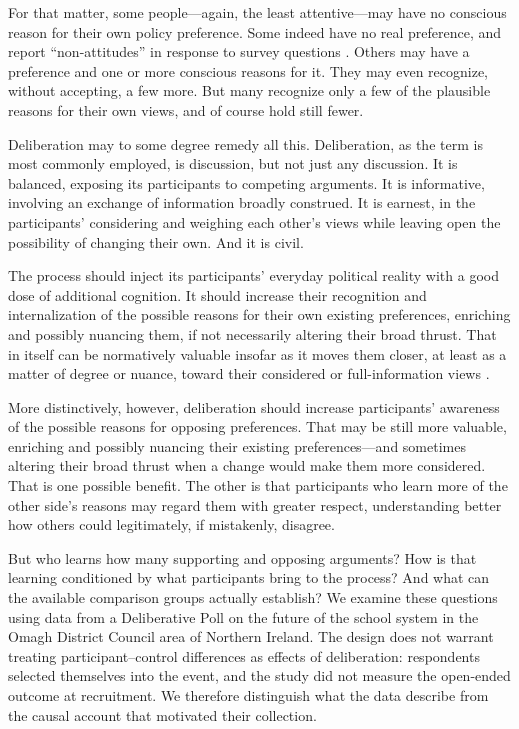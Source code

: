 \documentclass[11pt]{article}
\begin{document}
For that matter, some people---again, the least attentive---may have no conscious reason for
their own policy preference. Some indeed have no real preference, and report ``non-attitudes''
in response to survey questions \citep{converse1964nature,converse1970attitudes}. Others may have a preference
and one or more conscious reasons for it. They may even recognize, without accepting, a few
more. But many recognize only a few of the plausible reasons for their own views, and of course
hold still fewer.

Deliberation may to some degree remedy all this. Deliberation, as the term is most commonly
employed, is discussion, but not just any discussion. It is balanced, exposing its participants
to competing arguments. It is informative, involving an exchange of information broadly
construed. It is earnest, in the participants' considering and weighing each other's views while
leaving open the possibility of changing their own. And it is civil.

The process should inject its participants' everyday political reality with a good dose of
additional cognition. It should increase their recognition and internalization of the possible
reasons for their own existing preferences, enriching and possibly nuancing them, if not
necessarily altering their broad thrust. That in itself can be normatively valuable insofar as
it moves them closer, at least as a matter of degree or nuance, toward their considered or
full-information views \citep{tocqueville1969democracy,fishkin1991democracy,
dahl1989democracy,arendt1968truth}.

More distinctively, however, deliberation should increase participants' awareness of the
possible reasons for opposing preferences. That may be still more valuable, enriching and
possibly nuancing their existing preferences---and sometimes altering their broad thrust when
a change would make them more considered. That is one possible benefit. The other is that
participants who learn more of the other side's reasons may regard them with greater respect,
understanding better how others could legitimately, if mistakenly, disagree.

But who learns how many supporting and opposing arguments? How is that learning conditioned
by what participants bring to the process? And what can the available comparison groups
actually establish? We examine these questions using data from a Deliberative Poll on the
future of the school system in the Omagh District Council area of Northern Ireland. The design
does not warrant treating participant--control differences as effects of deliberation:
respondents selected themselves into the event, and the study did not measure the open-ended
outcome at recruitment. We therefore distinguish what the data describe from the causal account
that motivated their collection.
\end{document}
